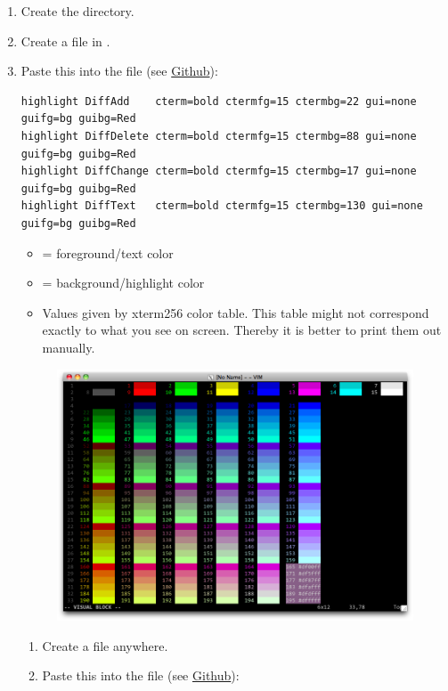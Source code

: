 \begin{enumerate}
    \item Create the  directory. 
    \item Create a file  in .
    \item Paste this into the file (see \href{https://github.com/robinhellmers/computer_setup/blob/master/mycolorscheme.vim}{Github}):
    
\begin{verbatim}
highlight DiffAdd    cterm=bold ctermfg=15 ctermbg=22 gui=none guifg=bg guibg=Red
highlight DiffDelete cterm=bold ctermfg=15 ctermbg=88 gui=none guifg=bg guibg=Red
highlight DiffChange cterm=bold ctermfg=15 ctermbg=17 gui=none guifg=bg guibg=Red
highlight DiffText   cterm=bold ctermfg=15 ctermbg=130 gui=none guifg=bg guibg=Red
\end{verbatim}

    \begin{itemize}
        \item {} = foreground/text color
        \item {} = background/highlight color
        \item Values given by xterm256 color table. This table might not correspond exactly to what you see on screen. Thereby it is better to print them out manually.
    \end{itemize}
    \begin{figure}[H]
        \centering
        \includegraphics[width = \textwidth]{Figures/WSL/xterm256_color_table.png}
    \end{figure}
    \begin{enumerate}
        \item Create a file  anywhere.
        \newpage
        \item Paste this into the file (see \href{https://github.com/robinhellmers/computer_setup/blob/master/color_demo.vim}{Github}):
        

\end{enumerate}
\end{enumerate}

